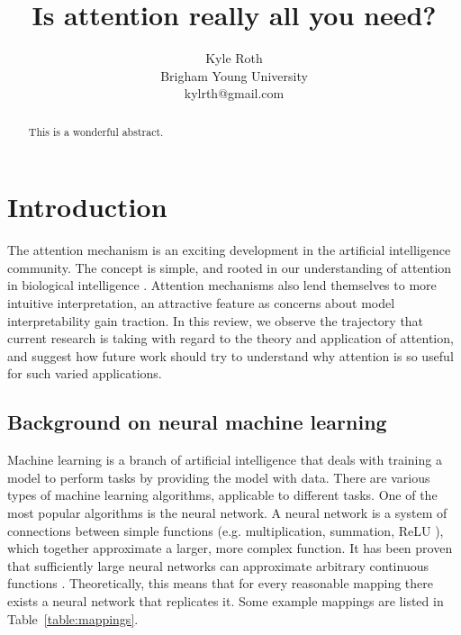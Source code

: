 \documentclass{article}
\title{Is attention really all you need?}
\author{
Kyle Roth\\
\affiliations
Brigham Young University\\
\emails
kylrth@gmail.com
}
\begin{document}
\maketitle

\tableofcontents

\vspace{30px}

\begin{abstract}
This is a wonderful abstract.
\end{abstract}

\section{Introduction}

The attention mechanism is an exciting development in the artificial intelligence community. The concept is simple, and rooted in our understanding of attention in biological intelligence \cite{glimpses,neuroscience-inspired}. Attention mechanisms also lend themselves to more intuitive interpretation, an attractive feature as concerns about model interpretability gain traction. In this review, we observe the trajectory that current research is taking with regard to the theory and application of attention, and suggest how future work should try to understand why attention is so useful for such varied applications.

\subsection{Background on neural machine learning}

Machine learning is a branch of artificial intelligence that deals with training a model to perform tasks by providing the model with data. There are various types of machine learning algorithms, applicable to different tasks. One of the most popular algorithms is the neural network. A neural network is a system of connections between simple functions (e.g. multiplication, summation, ReLU \cite{relu}), which together approximate a larger, more complex function. It has been proven that sufficiently large neural networks can approximate arbitrary continuous functions \cite{universal_approximators}. Theoretically, this means that for every reasonable mapping there exists a neural network that replicates it. Some example mappings are listed in Table~\ref{table:mappings}.
\end{document}
